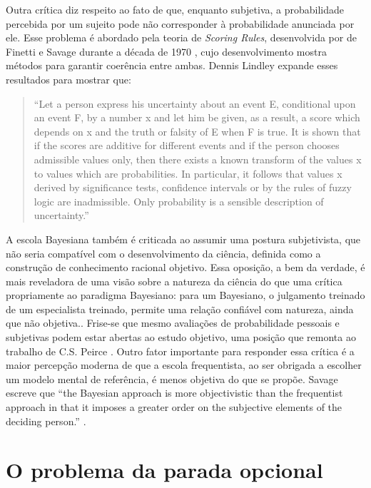 Outra crítica diz respeito ao fato de que, enquanto subjetiva, a probabilidade percebida por um sujeito pode não corresponder
à probabilidade anunciada por ele. Esse problema é abordado pela teoria de {\em Scoring Rules}, desenvolvida por
de Finetti e Savage durante a década de 1970 \citep{Lindley82}, cujo
desenvolvimento mostra métodos para garantir coerência entre ambas. Dennis Lindley expande esses resultados para mostrar que:

\begin{quote}
``Let a person express his uncertainty about an event E, conditional upon an event F, by a number x and let him be given, 
as a result, a score which depends on x and the truth or falsity of E when F is true. It is shown that if the scores are 
additive for different events and if the person chooses admissible values only, then there exists a known transform of the 
values x to values which are probabilities. In particular, it follows that values x derived by significance tests, confidence 
intervals or by the rules of fuzzy logic are inadmissible. Only probability is a sensible description of uncertainty.''
\citep{Lindley82}
\end{quote}

A escola Bayesiana também é criticada ao assumir uma postura subjetivista, que não seria compatível com o desenvolvimento
da ciência, definida como a construção de conhecimento racional objetivo. Essa oposição, a bem da verdade, é mais reveladora
de uma visão sobre a natureza da ciência do que uma crítica propriamente ao paradigma Bayesiano:
para um Bayesiano, o julgamento treinado de um especialista treinado, permite uma relação confiável com natureza, 
ainda que não objetiva.. Frise-se que mesmo avaliações de probabilidade pessoais e subjetivas podem estar abertas 
ao estudo objetivo, uma posição que remonta ao trabalho
de C.S. Peirce \citep{Stigler78}.  Outro fator importante para responder essa crítica é a maior percepção moderna
de que a escola frequentista, ao ser obrigada a escolher um modelo mental de referência, é menos objetiva do que se propõe.
Savage escreve que ``the Bayesian approach is more objectivistic than the frequentist approach in that it imposes a greater
order on the subjective elements of the deciding person.'' \citep{Savage60}.

\section{O problema da parada opcional} 

